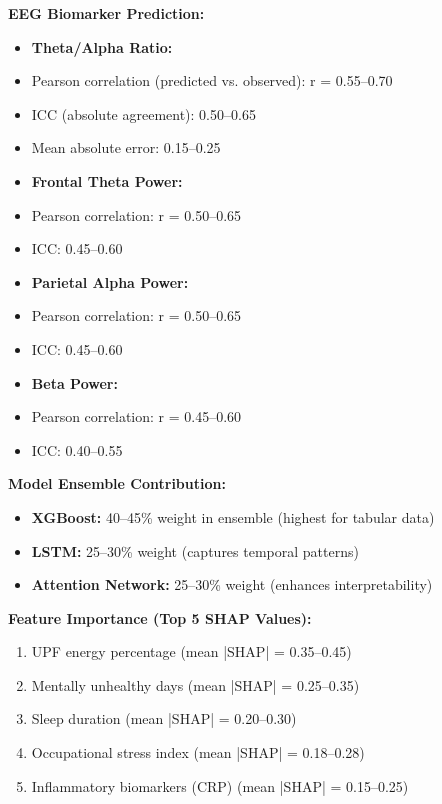 \documentclass[journal,twoside,10pt]{IEEEtran}
\begin{document}
\textbf{EEG Biomarker Prediction:}
\begin{itemize}
\item \textbf{Theta/Alpha Ratio:}
\item Pearson correlation (predicted vs. observed): r = 0.55--0.70
\item ICC (absolute agreement): 0.50--0.65
\item Mean absolute error: 0.15--0.25
\item \textbf{Frontal Theta Power:}
\item Pearson correlation: r = 0.50--0.65
\item ICC: 0.45--0.60
\item \textbf{Parietal Alpha Power:}
\item Pearson correlation: r = 0.50--0.65
\item ICC: 0.45--0.60
\item \textbf{Beta Power:}
\item Pearson correlation: r = 0.45--0.60
\item ICC: 0.40--0.55
\end{itemize}

\textbf{Model Ensemble Contribution:}
\begin{itemize}
\item \textbf{XGBoost:} 40--45\% weight in ensemble (highest for tabular data)
\item \textbf{LSTM:} 25--30\% weight (captures temporal patterns)
\item \textbf{Attention Network:} 25--30\% weight (enhances interpretability)
\end{itemize}

\textbf{Feature Importance (Top 5 SHAP Values):}
\begin{enumerate}
\item UPF energy percentage (mean |SHAP| = 0.35--0.45)
\item Mentally unhealthy days (mean |SHAP| = 0.25--0.35)
\item Sleep duration (mean |SHAP| = 0.20--0.30)
\item Occupational stress index (mean |SHAP| = 0.18--0.28)
\item Inflammatory biomarkers (CRP) (mean |SHAP| = 0.15--0.25)
\end{enumerate}
\end{document}

